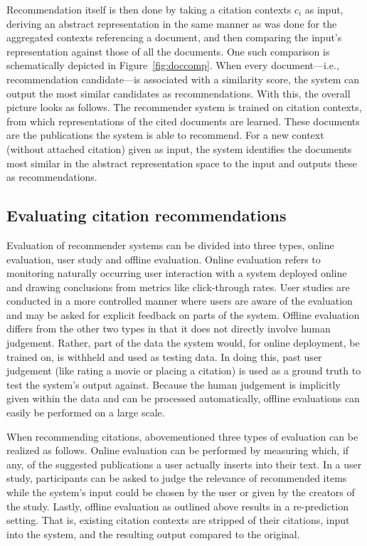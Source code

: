 Recommendation itself is then done by taking a citation contexts $c_i$ as input, deriving an abstract representation in the same manner as was done for the aggregated contexts referencing a document, and then comparing the input's representation against those of all the documents. One such comparison is schematically depicted in Figure~\ref{fig:doccomp}. When every document---i.e., recommendation candidate---is associated with a similarity score, the system can output the most similar candidates as recommendations. With this, the overall picture looks as follows. The recommender system is trained on citation contexts, from which representations of the cited documents are learned. These documents are the publications the system is able to recommend. For a new context (without attached citation) given as input, the system identifies the documents most similar in the abstract representation space to the input and outputs these as recommendations.

\subsection{Evaluating citation recommendations}
Evaluation of recommender systems can be divided into three types, online evaluation, user study and offline evaluation. Online evaluation refers to monitoring naturally occurring user interaction with a system deployed online and drawing conclusions from metrics like click-through rates. User studies are conducted in a more controlled manner where users are aware of the evaluation and may be asked for explicit feedback on parts of the system. Offline evaluation differs from the other two types in that it does not directly involve human judgement. Rather, part of the data the system would, for online deployment, be trained on, is withheld and used as testing data. In doing this, past user judgement (like rating a movie or placing a citation) is used as a ground truth to test the system's output against. Because the human judgement is implicitly given within the data and can be processed automatically, offline evaluations can easily be performed on a large scale.~\cite{Aggarwal2016}

When recommending citations, abovementioned three types of evaluation can be realized as follows. Online evaluation can be performed by measuring which, if any, of the suggested publications a user actually inserts into their text. In a user study, participants can be asked to judge the relevance of recommended items while the system's input could be chosen by the user or given by the creators of the study. Lastly, offline evaluation as outlined above results in a re-prediction setting. That is, existing citation contexts are stripped of their citations, input into the system, and the resulting output compared to the original.

